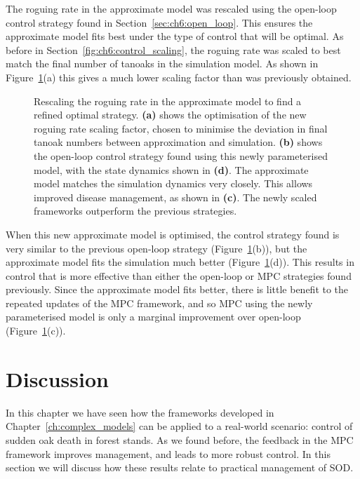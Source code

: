 The roguing rate in the approximate model was rescaled using the open-loop control strategy found in Section~\ref{sec:ch6:open_loop}. This ensures the approximate model fits best under the type of control that will be optimal. As before in Section~\ref{fig:ch6:control_scaling}, the roguing rate was scaled to best match the final number of tanoaks in the simulation model. As shown in Figure~\ref{fig:ch6:Global_optimal}(a) this gives a much lower scaling factor than was previously obtained.

\begin{figure}[t!]
    \begin{center}
        \caption[Refined optimal strategy under rescaled roguing rate]{Rescaling the roguing rate in the approximate model to find a refined optimal strategy. \textbf{(a)} shows the optimisation of the new roguing rate scaling factor, chosen to minimise the deviation in final tanoak numbers between approximation and simulation. \textbf{(b)} shows the open-loop control strategy found using this newly parameterised model, with the state dynamics shown in \textbf{(d)}. The approximate model matches the simulation dynamics very closely. This allows improved disease management, as shown in \textbf{(c)}. The newly scaled frameworks outperform the previous strategies.\label{fig:ch6:Global_optimal}}
    \end{center}
\end{figure}

When this new approximate model is optimised, the control strategy found is very similar to the previous open-loop strategy (Figure~\ref{fig:ch6:Global_optimal}(b)), but the approximate model fits the simulation much better (Figure~\ref{fig:ch6:Global_optimal}(d)). This results in control that is more effective than either the open-loop or MPC strategies found previously. Since the approximate model fits better, there is little benefit to the repeated updates of the MPC framework, and so MPC using the newly parameterised model is only a marginal improvement over open-loop (Figure~\ref{fig:ch6:Global_optimal}(c)).

\FloatBarrier
\section{Discussion\label{sec:ch6:discussion}}

In this chapter we have seen how the frameworks developed in Chapter~\ref{ch:complex_models} can be applied to a real-world scenario: control of sudden oak death in forest stands. As we found before, the feedback in the MPC framework improves management, and leads to more robust control. In this section we will discuss how these results relate to practical management of SOD.


